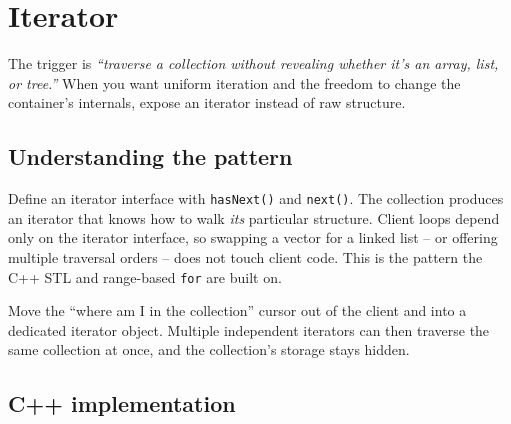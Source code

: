 \section{Iterator}
\label{sec:pat-iterator}


\begin{patternbox}
The trigger is \emph{``traverse a collection without revealing whether
it's an array, list, or tree.''} When you want uniform iteration and the
freedom to change the container's internals, expose an iterator instead of
raw structure.
\end{patternbox}

\subsection*{Understanding the pattern}

Define an iterator interface with \texttt{hasNext()} and \texttt{next()}.
The collection produces an iterator that knows how to walk \emph{its}
particular structure. Client loops depend only on the iterator interface,
so swapping a vector for a linked list -- or offering multiple traversal
orders -- does not touch client code. This is the pattern the C++ STL and
range-based \texttt{for} are built on.

\begin{ideabox}
Move the ``where am I in the collection'' cursor out of the client and
into a dedicated iterator object. Multiple independent iterators can then
traverse the same collection at once, and the collection's storage stays
hidden.
\end{ideabox}

\subsection*{C++ implementation}

